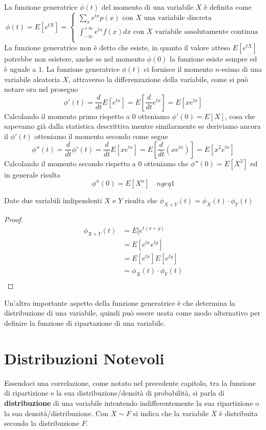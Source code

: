 \documentclass[a4paper,12pt, oneside]{book}
\begin{document}
La funzione generatrice $\phi(t)$ del momento di una variabile $X$ è definita come
\[ \phi(t) = E[e ^{tX}] = \begin{cases}
                              \sum _x e^{tx} p(x) \mbox{ con $X$ una variabile discreta}\\
                              \int _{-\infty}^{+\infty} e^{tx} f(x) dx \mbox{ con $X$ variabile assolutamente continua}\\
                          \end{cases} \]
La funzione generatrice non è detto che esiste, in quanto il valore atteso $E[e^{tX}]$ potrebbe non esistere, anche se 
nel momento $\phi(0)$ la funzione esiste sempre ed è uguale a $1$.\newline
La funzione generatrice $\phi(t)$ ci fornisce il momento $n$-esimo di una variabile aleatoria $X$, attraverso la
differenzazione della variabile, come si può notare ora nel proseguo
\[ \phi'(t) = \frac{d}{dt} E[e^{tx}] = E[\frac{d}{dt} e^{tx}] = E[xe^{tx}] \]
Calcolando il momento primo rispetto a $0$ otteniamo $\phi'(0) = E[X]$, cosa che sapevamo già dalla statistica descrittiva
mentre similarmente se deriviamo ancora il $\phi'(t)$ otteniamo il momento secondo come segue
\[ \phi''(t) = \frac{d}{dt} \phi'(t) = \frac{d}{dt} E[xe^{tx}] = E[\frac{d}{dt}(xe^{tx})] = E[x^2e^{tx}] \]
Calcolando il momento secondo rispetto a $0$ otteniamo che $\phi''(0) = E[X^2]$ ed in generale risulta
\[ \phi^n(0) = E[X^n] \quad n geq 1 \]
\begin{teo}
    Date due variabili indipendenti $X$ e $Y$ risulta che $\phi_{X + Y}(t) = \phi_X(t) \cdot \phi_Y(t)$
\end{teo}
\begin{proof}
    \[ \begin{split}
        \phi_{X + Y}(t) & = E[e^{t(x + y)} \\
                        & = E[e^{tx} e^{ty}] \\
                        & = E[e^{tx}] E[e^{ty}] \\
                        & = \phi_X(t) \cdot \phi_Y(t) \\
        \end{split} \]
\end{proof}
Un'altro importante aspetto della funzione generatrice è che determina la distribuzione di una variabile, quindi può
essere usata come modo alternativo per definire la funzione di ripartazione di una variabile.

\chapter{Distribuzioni Notevoli}
Essendoci una correlazione, come notato nel precedente capitolo, tra la funzione di ripartizione e
la sua distribuzione/densità di probabilità, si parla di \textbf{distribuzione} di una variabile
intentendo indifferentemente la sua ripartizione o la sua densità/distribuzione.\newline
Con $X \sim F$ si indica che la variabile $X$ è distribuita secondo la distribuzione $F$.
\end{document}
